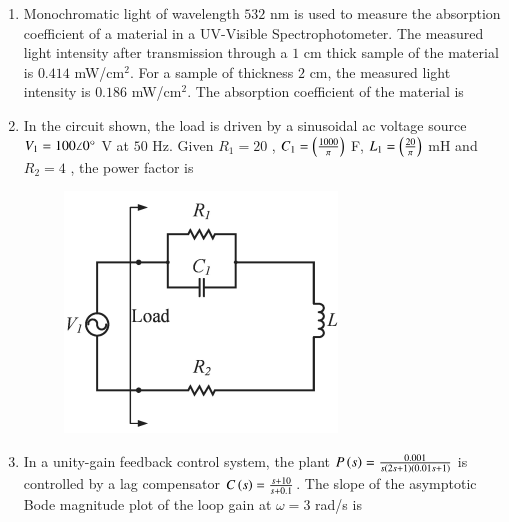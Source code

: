 \documentclass[journal,12pt,onecolumn]{IEEEtran}
\theoremstyle{remark}
\begin{document}
\begin{enumerate}
\item Monochromatic light of wavelength $532$ nm is used to measure the absorption coefficient of a material in a UV-Visible Spectrophotometer. The measured light intensity after transmission through a $1$ cm thick sample of the material is $0.414$ mW/cm$^2$. For a sample of thickness $2$ cm, the measured light intensity is $0.186$ mW/cm$^2$. The absorption coefficient  of the material is \underline{\hspace{2cm}} 

\hfill{}

\item In the circuit shown, the load is driven by a sinusoidal ac voltage source $V_1 = 100 \angle 0\degree$ V at $50$ Hz. Given $R_1 = 20$ \ohm, $C_1 = \left(\frac{1000}{\pi}\right)$ \textmu F, $L_1 = \left(\frac{20}{\pi}\right)$ mH and $R_2 = 4$ \ohm, the power factor is \underline{\hspace{2cm}} 

\begin{figure}[H]
    \centering
    \includegraphics[width=0.5\columnwidth]{q52}
    \caption*{}
    \label{fig:q52}
\end{figure}

\hfill{}

\item In a unity-gain feedback control system, the plant $P\left(s\right) = \frac{0.001}{s\left(2s+1\right)\left(0.01s+1\right)}$ is controlled by a lag compensator $C\left(s\right) = \frac{s+10}{s+0.1}$. The slope  of the asymptotic Bode magnitude plot of the loop gain at $\omega = 3$ rad/s is \underline{\hspace{2cm}} 

\hfill{}




\end{enumerate}
\end{document}
